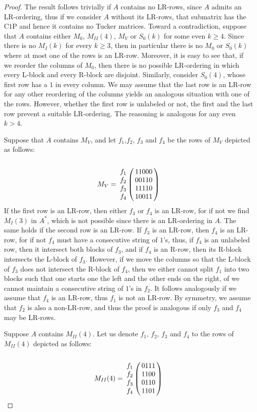 \documentclass[12pt]{book}
\theoremstyle{plain}
\theoremstyle{remark}
\begin{document}
\begin{proof}
The result follows trivially if $A$ contains no LR-rows, since $A$ admits an LR-ordering, thus if we consider $A$ without its LR-rows, that submatrix has the C$1$P and hence it contains no Tucker matrices. Toward a contradiction, suppose that $A$ contains either $M_0$, $M_{II}(4)$, $M_V$ or $S_0(k)$ for some even $k \geq 4$.
Since there is no $M_I(k)$ for every $k \geq 3$, then in particular there is no $M_0$ or $S_0(k)$ where at most one of the rows is an LR-row. Moreover, it is easy to see that, if we reorder the columns of $M_0$, then there is no possible LR-ordering in which every L-block and every R-block are disjoint.
Similarly, consider $S_0(4)$, whose first row has a $1$ in every column. We may assume that the last row is an LR-row for any other reordering of the columns yields an analogous situation with one of the rows. However, whether the first row is unlabeled or not, the first and the last row prevent a suitable LR-ordering. The reasoning is analogous for any even $k > 4$.

Suppose that $A$ contains $M_V$, and let $f_1$,$ f_2$, $f_3$ and $f_4$ be the rows of $M_V$ depicted as follows:
\[ M_V= \bordermatrix{ &  \cr
f_1 & 1 1 0 0 0 \cr
f_2 & 0 0 1 1 0 \cr
f_3 & 1 1 1 1 0 \cr
f_4 & 1 0 0 1 1  }
\]
If the first row is an LR-row, then either $f_3$ or $f_4$ is an LR-row, for if not we find $M_I(3)$ in $A^*$, which is not possible since there is an LR-ordering in $A$. The same holds if the second row is an LR-row. 
If $f_3$ is an LR-row, then $f_4$ is an LR-row, for if not $f_4$ must have a consecutive string of $1$'s, thus, if $f_4$ is an unlabeled row, then it intersect both blocks of $f_3$, and if $f_4$ is an R-row, then its R-block intersects the L-block of $f_3$. 
However, if we move the columns so that the L-block of $f_3$ does not intersect the R-block of $f_4$, then we either cannot split $f_1$ into two blocks such that one starts one the left and the other ends on the right, of we cannot maintain a consecutive string of $1$'s in $f_2$. It follows analogously if we assume that $f_4$ is an LR-row, thus $f_1$ is not an LR-row. By symmetry, we assume that $f_2$ is also a non-LR-row, and thus the proof is analogous if only $f_3$ and $f_4$ may be LR-rows. 

Suppose $A$ contains $M_{II}(4)$. Let us denote $f_1$, $f_2$, $f_3$ and $f_4$ to the rows of $M_{II}(4)$ depicted as follows:
\[ M_{II}(4) = \bordermatrix{ &  \cr
f_1 & 0 1 1 1 \cr
f_2 & 1 1 0 0 \cr
f_3 & 0 1 1 0 \cr
f_4 & 1 1 0 1 }
\]


\end{proof}
\end{document}
